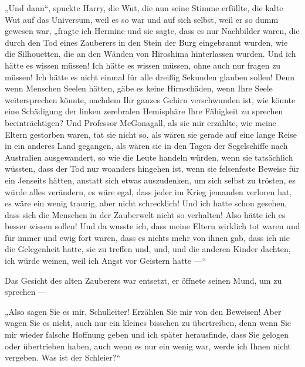 „Und dann“, spuckte Harry, die Wut, die nun seine Stimme erfüllte, die kalte Wut auf das Universum, weil es so war und auf sich selbst, weil er so dumm gewesen war, „fragte ich Hermine und sie sagte, dass es nur Nachbilder waren, die durch den Tod eines Zauberers in den Stein der Burg eingebrannt wurden, wie die Silhouetten, die an den Wänden von Hiroshima hinterlassen wurden. Und ich hätte es wissen müssen! Ich hätte es wissen müssen, ohne auch nur fragen zu müssen! Ich hätte es nicht einmal für alle dreißig Sekunden glauben sollen! Denn wenn Menschen Seelen hätten, gäbe es keine Hirnschäden, wenn Ihre Seele weitersprechen könnte, nachdem Ihr ganzes Gehirn verschwunden ist, wie könnte eine Schädigung der linken zerebralen Hemisphäre Ihre Fähigkeit zu sprechen beeinträchtigen? Und Professor McGonagall, als sie mir erzählte, wie meine Eltern gestorben waren, tat sie nicht so, als wären sie gerade auf eine lange Reise in ein anderes Land gegangen, als wären sie in den Tagen der Segelschiffe nach Australien ausgewandert, so wie die Leute handeln würden, wenn sie tatsächlich wüssten, dass der Tod nur woanders hingehen ist, wenn sie felsenfeste Beweise für ein Jenseits hätten, anstatt sich etwas auszudenken, um sich selbst zu trösten, es würde alles verändern, es wäre egal, dass jeder im Krieg jemanden verloren hat, es wäre ein wenig traurig, aber nicht schrecklich! Und ich hatte schon gesehen, dass sich die Menschen in der Zauberwelt nicht so verhalten! Also hätte ich es besser wissen sollen! Und da wusste ich, dass meine Eltern wirklich tot waren und für immer und ewig fort waren, dass es nichts mehr von ihnen gab, dass ich nie die Gelegenheit hatte, sie zu treffen und, und, und die anderen Kinder dachten, ich würde weinen, weil ich Angst vor Geistern hatte —“

Das Gesicht des alten Zauberers war entsetzt, er öffnete seinen Mund, um zu sprechen —

„Also sagen Sie es mir, Schulleiter! Erzählen Sie mir von den Beweisen! Aber wagen Sie es nicht, auch nur ein kleines bisschen zu übertreiben, denn wenn Sie mir wieder falsche Hoffnung geben und ich später herausfinde, dass Sie gelogen oder übertrieben haben, auch wenn es nur ein wenig war, werde ich Ihnen nicht vergeben. Was ist der Schleier?“

